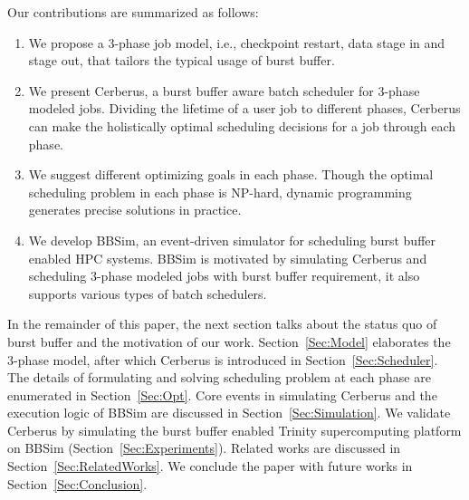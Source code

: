 Our contributions are summarized as follows:
\begin{enumerate}
        \item %
                We propose a 3-phase job model, i.e.,  checkpoint restart,
                data stage in and stage out, that tailors the typical usage of burst buffer.
        \item   We present Cerberus,
                a burst buffer aware batch scheduler for 3-phase modeled jobs.
                Dividing the lifetime of a user job to different phases,
                Cerberus can make the holistically optimal scheduling decisions 
                for a job through each phase.
        \item   We suggest different optimizing goals in each phase.
                Though the optimal scheduling problem in each phase is NP-hard,
                dynamic programming generates precise solutions
                in practice.
        \item   We develop BBSim, an event-driven simulator for scheduling
                burst buffer enabled HPC systems.
                BBSim is motivated by simulating Cerberus and scheduling
                3-phase modeled jobs with burst buffer requirement,
                it also supports various types of batch schedulers.
\end{enumerate}


In the remainder of this paper,
the next section talks about the status quo of burst buffer and
the motivation of our work.
Section~\ref{Sec:Model} elaborates the 3-phase model,
after which Cerberus is introduced in Section~\ref{Sec:Scheduler}.
The details of formulating and solving scheduling problem
at each phase are enumerated in Section~\ref{Sec:Opt}.
Core events in simulating Cerberus and the execution logic of BBSim are discussed in Section~\ref{Sec:Simulation}.
We validate Cerberus by simulating the burst buffer enabled
Trinity supercomputing platform on BBSim (Section~\ref{Sec:Experiments}).
Related works are discussed in Section~\ref{Sec:RelatedWorks}.
We conclude the paper with future works in Section~\ref{Sec:Conclusion}.


